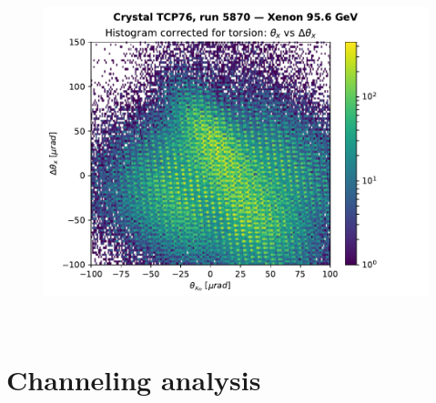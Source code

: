 \documentclass[10pt]{beamer}
\begin{document}
\begin{frame}
\begin{columns}[c]
\begin{figure}
\includegraphics[width=\linewidth]{corrected_histo.pdf}\\
\end{figure}

\end{columns}
\end{frame}












\section{Channeling analysis}

% 
% 
% 
% 
% 
% 
\end{document}
